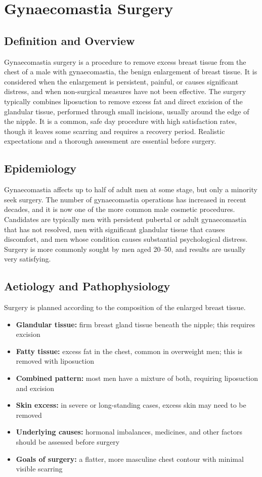 \chapter{Gynaecomastia Surgery}

\section*{Definition and Overview}
Gynaecomastia surgery is a procedure to remove excess breast tissue from the chest of a male with gynaecomastia, the benign enlargement of breast tissue. It is considered when the enlargement is persistent, painful, or causes significant distress, and when non-surgical measures have not been effective. The surgery typically combines liposuction to remove excess fat and direct excision of the glandular tissue, performed through small incisions, usually around the edge of the nipple. It is a common, safe day procedure with high satisfaction rates, though it leaves some scarring and requires a recovery period. Realistic expectations and a thorough assessment are essential before surgery.

\section*{Epidemiology}
Gynaecomastia affects up to half of adult men at some stage, but only a minority seek surgery. The number of gynaecomastia operations has increased in recent decades, and it is now one of the more common male cosmetic procedures. Candidates are typically men with persistent pubertal or adult gynaecomastia that has not resolved, men with significant glandular tissue that causes discomfort, and men whose condition causes substantial psychological distress. Surgery is more commonly sought by men aged 20--50, and results are usually very satisfying.

\section*{Aetiology and Pathophysiology}
Surgery is planned according to the composition of the enlarged breast tissue.

\begin{itemize}
    \item \textbf{Glandular tissue:} firm breast gland tissue beneath the nipple; this requires excision
    \item \textbf{Fatty tissue:} excess fat in the chest, common in overweight men; this is removed with liposuction
    \item \textbf{Combined pattern:} most men have a mixture of both, requiring liposuction and excision
    \item \textbf{Skin excess:} in severe or long-standing cases, excess skin may need to be removed
    \item \textbf{Underlying causes:} hormonal imbalances, medicines, and other factors should be assessed before surgery
    \item \textbf{Goals of surgery:} a flatter, more masculine chest contour with minimal visible scarring
\end{itemize}

